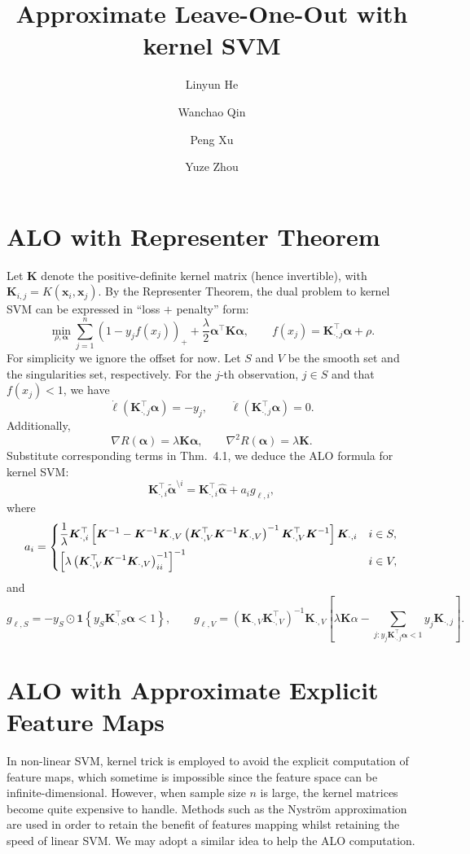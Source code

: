 \documentclass[11pt]{article}
\title{Approximate Leave-One-Out with kernel SVM}
\author{Linyun He \and Wanchao Qin \and Peng Xu \and Yuze Zhou}
\newcommand{\bx}{\bm{x}}
\newcommand{\bK}{\bm{K}}
\newcommand{\balpha}{\bm{\alpha}}
\newcommand{\refthm}[2]{#1~#2}
\begin{document}
\maketitle

\section{ALO with Representer Theorem}
Let \(\bK\) denote the positive-definite kernel matrix (hence invertible), with \(\bK_{i,j}=K(\bx_i,\bx_j)\). By the Representer Theorem, the dual problem to kernel SVM can be expressed in ``loss \(+\) penalty'' form:
\begin{equation}
\min_{\rho,\balpha}\sum_{j=1}^{n}\left(1-y_jf(x_j)\right)_++\frac{\lambda}{2}\balpha^\top\bK\balpha, \qquad f(x_j)=\bK_{\cdot,j}^\top\balpha+\rho.
\end{equation}
For simplicity we ignore the offset for now. Let \(S\) and \(V\) be the smooth set and the singularities set, respectively. For the \(j\)-th observation, \(j\in S\) and that \(f(x_j)<1\), we have \[\dot{\ell}(\bK_{\cdot,j}^\top\balpha)=-y_j,\qquad\ddot{\ell}(\bK_{\cdot,j}^\top\balpha)=0.\] Additionally, \[\nabla R(\balpha)=\lambda\bK\balpha,\qquad\nabla^2R(\balpha)=\lambda\bK.\] Substitute corresponding terms in \refthm{Thm.}{4.1}, we deduce the ALO formula for kernel SVM: \[\bK_{\cdot,i}^\top\tilde{\balpha}^{\setminus i}=\bK_{\cdot,i}^\top\hat{\balpha}+a_ig_{\ell,i},\] where \[a_i=\begin{dcases}
\frac{1}{\lambda}\bK_{\cdot,i}^\top\left[\bK^{-1}-\bK^{-1}\bK_{\cdot,V}\left(\bK_{\cdot,V}^\top\bK^{-1}\bK_{\cdot,V}\right)^{-1}\bK_{\cdot,V}^\top\bK^{-1}\right]\bK_{\cdot,i} & i\in S,\\
\left[\lambda\left(\bK_{\cdot,V}^\top\bK^{-1}\bK_{\cdot,V}\right)^{-1}_{ii}\right]^{-1} & i\in V,
\end{dcases}\] and \[g_{\ell, S}=-y_S\odot\bm{1}\left\{y_S\bK_{\cdot,S}^\top\balpha<1\right\},\qquad g_{\ell, V}=\left(\bK_{\cdot,V}\bK_{\cdot,V}^\top\right)^{-1}\bK_{\cdot,V}\left[\lambda\bK\alpha-\sum_{j:y_j\bK_{\cdot,j}^\top\balpha<1}y_j\bK_{\cdot,j}\right].\]

\section{ALO with Approximate Explicit Feature Maps}
In non-linear SVM, kernel trick is employed to avoid the explicit computation of feature maps, which sometime is impossible since the feature space can be infinite-dimensional. However, when sample size \(n\) is large, the kernel matrices become quite expensive to handle. Methods such as the Nystr\"{o}m approximation are used in order to retain the benefit of features mapping whilst retaining the speed of linear SVM. We may adopt a similar idea to help the ALO computation.
\end{document}
